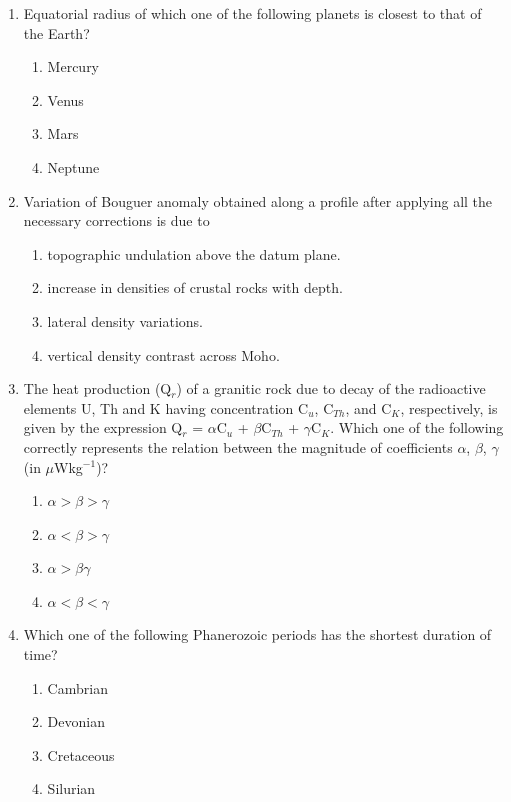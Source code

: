 \documentclass[journal,12pt,onecolumn]{IEEEtran}
\theoremstyle{remark}
\begin{document}
\begin{enumerate}
\item Equatorial radius of which one of the following planets is closest to that of the Earth?
\begin{enumerate}
\item Mercury
\item Venus
\item Mars
\item Neptune
\end{enumerate}
\vspace{0.5cm}


\item Variation of Bouguer anomaly obtained along a profile after applying all the necessary corrections is due to
\begin{enumerate}
\item topographic undulation above the datum plane.
\item increase in densities of crustal rocks with depth.
\item lateral density variations.
\item vertical density contrast across Moho.
\end{enumerate}
\vspace{0.5cm}

\item The heat production (Q$_r$) of a granitic rock due to decay of the radioactive elements U, Th and K having concentration C$_u$, C$_{Th}$, and C$_K$, respectively, is given by the expression Q$_r$ = $\alpha$C$_u$ + $\beta$C$_{Th}$ + $\gamma$C$_K$. Which one of the following correctly represents the relation between the magnitude of coefficients $\alpha$, $\beta$, $\gamma$ (in $\mu$Wkg$^{-1}$)?
\begin{enumerate}
\item $\alpha > \beta > \gamma$
\item $\alpha < \beta > \gamma$
\item $\alpha > \beta \gamma$
\item $\alpha < \beta < \gamma$
\end{enumerate}
\vspace{0.5cm}

\item Which one of the following Phanerozoic periods has the shortest duration of time?
\begin{enumerate}
\item Cambrian
\item Devonian
\item Cretaceous
\item Silurian
\end{enumerate}


\end{enumerate}
\end{document}
